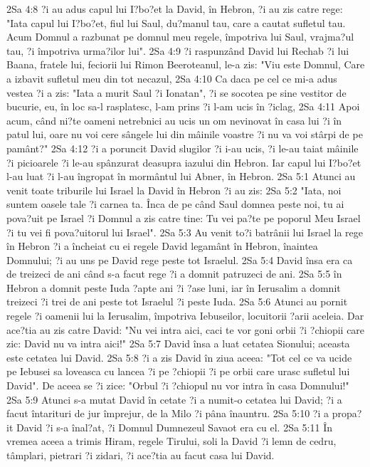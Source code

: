 2Sa 4:8  ?i au adus capul lui I?bo?et la David, în Hebron, ?i au zis catre rege: "Iata capul lui I?bo?et, fiul lui Saul, du?manul tau, care a cautat sufletul tau. Acum Domnul a razbunat pe domnul meu regele, împotriva lui Saul, vrajma?ul tau, ?i împotriva urma?ilor lui".
2Sa 4:9  ?i raspunzând David lui Rechab ?i lui Baana, fratele lui, feciorii lui Rimon Beeroteanul, le-a zis: "Viu este Domnul, Care a izbavit sufletul meu din tot necazul,
2Sa 4:10  Ca daca pe cel ce mi-a adus vestea ?i a zis: "Iata a murit Saul ?i Ionatan", ?i se socotea pe sine vestitor de bucurie, eu, în loc sa-l rasplatesc, l-am prins ?i l-am ucis în ?iclag,
2Sa 4:11  Apoi acum, când ni?te oameni netrebnici au ucis un om nevinovat în casa lui ?i în patul lui, oare nu voi cere sângele lui din mâinile voastre ?i nu va voi stârpi de pe pamânt?"
2Sa 4:12  ?i a poruncit David slugilor ?i i-au ucis, ?i le-au taiat mâinile ?i picioarele ?i le-au spânzurat deasupra iazului din Hebron. Iar capul lui I?bo?et l-au luat ?i l-au îngropat în mormântul lui Abner, în Hebron.
2Sa 5:1  Atunci au venit toate triburile lui Israel la David în Hebron ?i au zis:
2Sa 5:2  "Iata, noi suntem oasele tale ?i carnea ta. Înca de pe când Saul domnea peste noi, tu ai pova?uit pe Israel ?i Domnul a zis catre tine: Tu vei pa?te pe poporul Meu Israel ?i tu vei fi pova?uitorul lui Israel".
2Sa 5:3  Au venit to?i batrânii lui Israel la rege în Hebron ?i a încheiat cu ei regele David legamânt în Hebron, înaintea Domnului; ?i au uns pe David rege peste tot Israelul.
2Sa 5:4  David însa era ca de treizeci de ani când s-a facut rege ?i a domnit patruzeci de ani.
2Sa 5:5  în Hebron a domnit peste Iuda ?apte ani ?i ?ase luni, iar în Ierusalim a domnit treizeci ?i trei de ani peste tot Israelul ?i peste Iuda.
2Sa 5:6  Atunci au pornit regele ?i oamenii lui la Ierusalim, împotriva Iebuseilor, locuitorii ?arii aceleia. Dar ace?tia au zis catre David: "Nu vei intra aici, caci te vor goni orbii ?i ?chiopii care zic: David nu va intra aici!"
2Sa 5:7  David însa a luat cetatea Sionului; aceasta este cetatea lui David.
2Sa 5:8  ?i a zis David în ziua aceea: "Tot cel ce va ucide pe Iebusei sa loveasca cu lancea ?i pe ?chiopii ?i pe orbii care urasc sufletul lui David". De aceea se ?i zice: "Orbul ?i ?chiopul nu vor intra în casa Domnului!"
2Sa 5:9  Atunci s-a mutat David în cetate ?i a numit-o cetatea lui David; ?i a facut întarituri de jur împrejur, de la Milo ?i pâna înauntru.
2Sa 5:10  ?i a propa?it David ?i s-a înal?at, ?i Domnul Dumnezeul Savaot era cu el.
2Sa 5:11  În vremea aceea a trimis Hiram, regele Tirului, soli la David ?i lemn de cedru, tâmplari, pietrari ?i zidari, ?i ace?tia au facut casa lui David.
